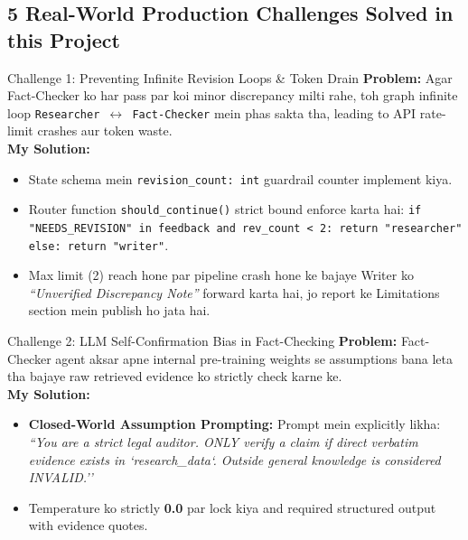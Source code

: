\documentclass[9.5pt, a4paper]{article}
\begin{document}
\subsection{5 Real-World Production Challenges Solved in this Project}

\begin{interviewbox}{Challenge 1: Preventing Infinite Revision Loops \& Token Drain}
\textbf{Problem:} Agar Fact-Checker ko har pass par koi minor discrepancy milti rahe, toh graph infinite loop \texttt{Researcher $\leftrightarrow$ Fact-Checker} mein phas sakta tha, leading to API rate-limit crashes aur token waste.\\
\textbf{My Solution:} 
\begin{itemize}
    \item State schema mein \texttt{revision\_count: int} guardrail counter implement kiya.
    \item Router function \texttt{should\_continue()} strict bound enforce karta hai:
    \texttt{if "NEEDS\_REVISION" in feedback and rev\_count < 2: return "researcher" else: return "writer"}.
    \item Max limit (2) reach hone par pipeline crash hone ke bajaye Writer ko \textit{``Unverified Discrepancy Note''} forward karta hai, jo report ke Limitations section mein publish ho jata hai.
\end{itemize}
\end{interviewbox}

\begin{interviewbox}{Challenge 2: LLM Self-Confirmation Bias in Fact-Checking}
\textbf{Problem:} Fact-Checker agent aksar apne internal pre-training weights se assumptions bana leta tha bajaye raw retrieved evidence ko strictly check karne ke.\\
\textbf{My Solution:}
\begin{itemize}
    \item \textbf{Closed-World Assumption Prompting:} Prompt mein explicitly likha: \textit{``You are a strict legal auditor. ONLY verify a claim if direct verbatim evidence exists in `research\_data`. Outside general knowledge is considered INVALID.''}
    \item Temperature ko strictly \textbf{0.0} par lock kiya and required structured output with evidence quotes.
\end{itemize}
\end{interviewbox}
\end{document}
